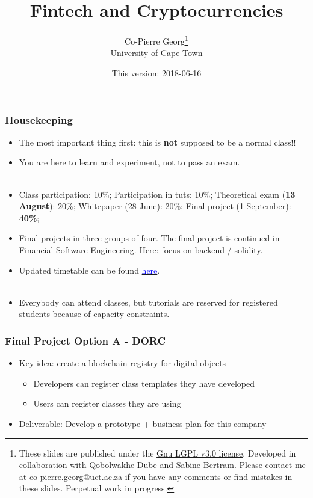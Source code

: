 \documentclass[10pt]{beamer}
\title
{Fintech and Cryptocurrencies}
\author[Co-Pierre Georg]
{
Co-Pierre Georg\footnote{These slides are published under the \href{https://www.gnu.org/licenses/lgpl-3.0.en.html}{Gnu LGPL v3.0 license}. Developed in collaboration with Qobolwakhe Dube and Sabine Bertram. Please contact me at \url{co-pierre.georg@uct.ac.za} if you have any comments or find mistakes in these slides. Perpetual work in progress.}\\
University of Cape Town
}
\date
{This version: 2018-06-16}
\begin{document}
\begin{frame}
  \titlepage
\end{frame}

\begin{frame}
  \frametitle{Housekeeping}
  \begin{itemize}
    \item The most important thing first: this is \textbf{not} supposed to be a normal class!!
    \item You are here to learn and experiment, not to pass an exam.\\
    ~\\
    \pause
    \item Class participation: 10\%; Participation in tuts: 10\%; Theoretical exam (\textbf{13 August}): 20\%; Whitepaper (28 June): 20\%; Final project (1 September): \textbf{40\%};\\
    \item Final projects in three groups of four. The final project is continued in Financial Software Engineering. Here: focus on backend / solidity.
    ~\\
    \pause
    \item Updated timetable can be found \href{https://docs.google.com/spreadsheets/d/1pKzULj4H33-thAPFxcg1UaOOD9w4S7uBTE4fMKJN8kA/edit?usp=sharing}{\textcolor{blue}{here}}.\\
    ~\\
    \pause
    \item Everybody can attend classes, but tutorials are reserved for registered students because of capacity constraints.
  \end{itemize}
\end{frame}

\begin{frame}
  \frametitle{Final Project Option A - DORC}
  \begin{itemize}\itemsep10pt
    \item Key idea: create a blockchain registry for digital objects
    \begin{itemize}\itemsep5pt
      \item Developers can register class templates they have developed
      \item Users can register classes they are using
    \end{itemize}
    \item Deliverable: Develop a prototype + business plan for this company
  \end{itemize}
\end{frame}
\end{document}
